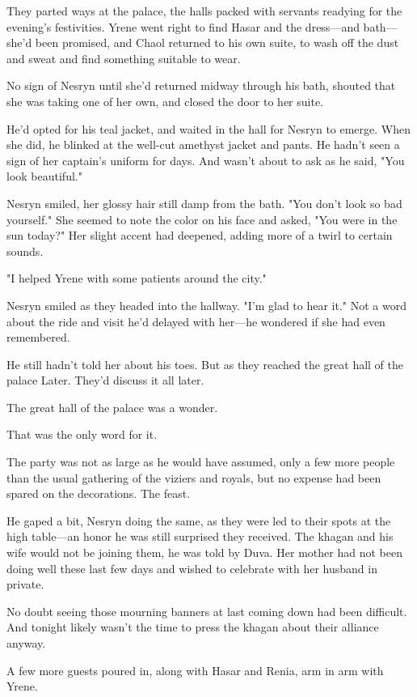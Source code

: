 They parted ways at the palace, the halls packed with servants readying for the evening's festivities. Yrene went right to find Hasar and the dress---and bath--- she'd been promised, and Chaol returned to his own suite, to wash off the dust and sweat and find something suitable to wear.

No sign of Nesryn until she'd returned midway through his bath, shouted that she was taking one of her own, and closed the door to her suite.

He'd opted for his teal jacket, and waited in the hall for Nesryn to emerge. When she did, he blinked at the well-cut amethyst jacket and pants. He hadn't seen a sign of her captain's uniform for days. And wasn't about to ask as he said, "You look beautiful."

Nesryn smiled, her glossy hair still damp from the bath. "You don't look so bad yourself." She seemed to note the color on his face and asked, "You were in the sun today?" Her slight accent had deepened, adding more of a twirl to certain sounds.

"I helped Yrene with some patients around the city."

Nesryn smiled as they headed into the hallway. "I'm glad to hear it." Not a word about the ride and visit he'd delayed with her---he wondered if she had even remembered.

He still hadn't told her about his toes. But as they reached the great hall of the palace  Later. They'd discuss it all later.

The great hall of the palace was a wonder.

That was the only word for it.

The party was not as large as he would have assumed, only a few more people than the usual gathering of the viziers and royals, but no expense had been spared on the decorations. The feast.

He gaped a bit, Nesryn doing the same, as they were led to their spots at the high table---an honor he was still surprised they received. The khagan and his wife would not be joining them, he was told by Duva. Her mother had not been doing well these last few days and wished to celebrate with her husband in private.

No doubt seeing those mourning banners at last coming down had been difficult. And tonight likely wasn't the time to press the khagan about their alliance anyway.

A few more guests poured in, along with Hasar and Renia, arm in arm with Yrene.

